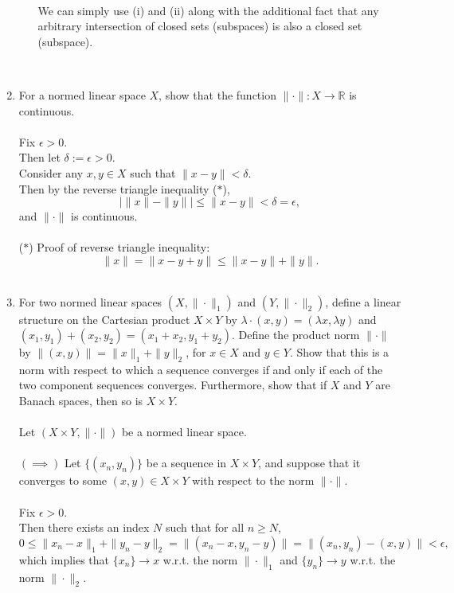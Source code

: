 \begin{enumerate}
\begin{enumerate}[label=(\roman*),align=left]
        \ \\We can simply use (i) and (ii) along with the additional fact that any arbitrary intersection of closed sets (subspaces) is also a closed set (subspace).
    \end{enumerate}
    \ \\\item For a normed linear space $X$, show that the function $\|\cdot\|:X\to\mathbb{R}$ is continuous.\\
    \\Fix $\epsilon>0$.
    \\Then let $\delta:=\epsilon>0$.
    \\Consider any $x,y\in X$ such that $\|x-y\|<\delta$.
    \\Then by the reverse triangle inequality ($\ast$),
    \[
        |\|x\|-\|y\||\le\|x-y\|<\delta=\epsilon,
    \]
    and $\|\cdot\|$ is continuous.\\
    \\($\ast$) Proof of reverse triangle inequality:
    \[
        \|x\|=\|x-y+y\|\le\|x-y\|+\|y\|.
    \]
    \ \\\item For two normed linear spaces $(X,\|\cdot\|_1)$ and $(Y,\|\cdot\|_2)$, define a linear structure on the Cartesian product $X\times Y$ by $\lambda\cdot(x,y)=(\lambda x,\lambda y)$ and $(x_1,y_1)+(x_2,y_2)=(x_1+x_2,y_1+y_2)$.
    Define the product norm $\|\cdot\|$ by $\|(x,y)\|=\|x\|_1+\|y\|_2$, for $x\in X$ and $y\in Y$.
    Show that this is a norm with respect to which a sequence converges if and only if each of the two component sequences converges.
    Furthermore, show that if $X$ and $Y$ are Banach spaces, then so is $X\times Y$.\\
    \\Let $(X\times Y,\|\cdot\|)$ be a normed linear space.\\
    \\$(\implies)$ Let $\{(x_n,y_n)\}$ be a sequence in $X\times Y$, and suppose that it converges to some $(x,y)\in X\times Y$ with respect to the norm $\|\cdot\|$.\\
    \\Fix $\epsilon>0$.
    \\Then there exists an index $N$ such that for all $n\ge N$,
    \[
        0\le\|x_n-x\|_1+\|y_n-y\|_2=\|(x_n-x,y_n-y)\|=\|(x_n,y_n)-(x,y)\|<\epsilon,
    \]
    which implies that $\{x_n\}\to x$ w.r.t. the norm $\|\cdot\|_1$ and $\{y_n\}\to y$ w.r.t. the norm $\|\cdot\|_2$.\\

\end{enumerate}
